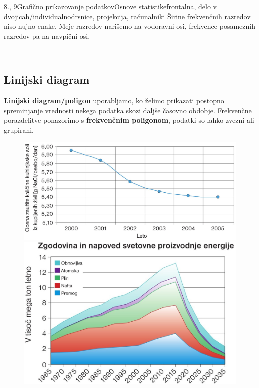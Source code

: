 \begin{priprava}{8., 9}{}{Grafično prikazovanje podatkov}{Osnove statistike}{frontalna, delo v dvojicah/individualno}{drsnice, projekcija, računalniki}
    Širine frekvenčnih razredov niso nujno enake.
    Meje razredov narišemo na vodoravni osi, frekvence posameznih razredov pa na navpični osi.



            




~

\subsection*{Linijski diagram}

    \textbf{Linijski diagram/poligon} uporabljamo, ko želimo prikazati postopno spreminjanje vrednosti nekega podatka skozi daljše časovno obdobje.
    Frekvenčne porazdelitve ponazorimo s \textbf{frekvenčnim poligonom}, podatki so lahko zvezni ali grupirani.
        
            \begin{figure}[H]
                \includegraphics[scale=0.23]{../../Slike_in_skice/1166.jpg}
                \includegraphics[scale=0.3]{../../Slike_in_skice/1099.jpg}
            \end{figure}
            


\end{priprava}
